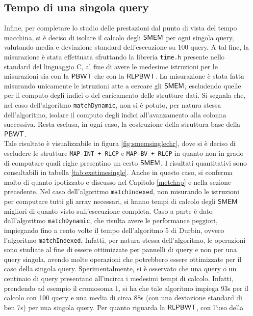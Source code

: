 \subsection{Tempo di una singola query}
Infine, per completare lo studio delle prestazioni dal punto di vista del tempo
macchina, si è deciso di 
isolare il calcolo degli $\mbox{\rm {\sf SMEM}}$ per ogni singola query, valutando media e
deviazione standard dell'esecuzione su 100 query. A tal fine, la misurazione è
stata 
effettuata sfruttando la libreria \texttt{time.h} presente nello standard del
linguaggio C, al fine di avere le medesime istruzioni per le misurazioni sia con
la $\mbox{\rm {\sf PBWT}}$ 
che con la $\mbox{\rm {\sf RLPBWT}}$. La misurazione è stata fatta misurando unicamente le
istruzioni atte a cercare gli $\mbox{\rm {\sf SMEM}}$, 
escludendo quelle per il computo degli indici o del caricamento delle strutture
dati.
Si segnala che, nel caso dell'algoritmo \texttt{matchDynamic}, non si è
potuto, per natura stessa dell'algoritmo, isolare il computo degli indici
all'avanzamento alla colonna successiva. Resta esclusa, in ogni caso, la
costruzione della struttura base della $\mbox{\rm {\sf PBWT}}$.
\\
Tale risultato è visualizzabile in figura
\ref{fig:smemsinglechr}, dove si è deciso di escludere le strutture
\texttt{MAP-INT + RLCP} e \texttt{MAP-BV + RLCP} in quanto non in grado di
computare quali righe presentino un certo $\mbox{\rm {\sf SMEM}}$. I risultati
quantitativi sono consultabili in tabella \ref{tab:exetimesingle}. Anche in
questo caso, 
si conferma molto di quanto ipotizzato e discusso nel Capitolo
\ref{metchap} e nella sezione precedente. Nel caso dell'algoritmo
\texttt{matchIndexed}, non misurando le istruzioni per computare 
tutti gli array necessari, si hanno tempi di calcolo degli $\mbox{\rm {\sf SMEM}}$ migliori di
quanto visto sull'esecuzione completa. Caso a parte
è dato dall'algoritmo \texttt{matchDynamic}, che risulta avere le performance
peggiori, impiegando fino a cento volte il tempo dell'algoritmo 5 di
Durbin, ovvero l'algoritmo \texttt{matchIndexed}. Infatti, per natura stessa
dell'algoritmo,  
le operazioni sono studiate al fine di essere ottimizzate per pannelli di query
e non per una query singola, avendo molte
operazioni che potrebbero essere ottimizzate per il caso della singola
query. Sperimentalmente, si è
osservato che una query o un centinaio di query presentano all'incirca i
medesimi tempi di calcolo. Infatti, prendendo ad esempio il cromosoma 1, si ha
che tale 
algoritmo impiega 93s per il calcolo con 100 query e una media di circa 88s (con
una deviazione standard di ben 7s) per
una singola query. Per quanto riguarda la $\mbox{\rm {\sf RLPBWT}}$, con l'uso della
